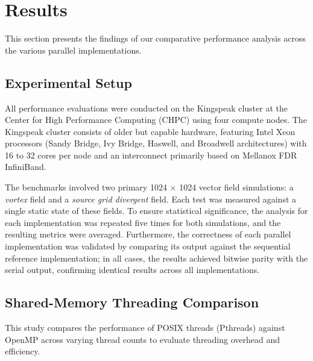 \section{Results}

This section presents the findings of our comparative performance analysis across the various parallel implementations.


\subsection{Experimental Setup}

All performance evaluations were conducted on the Kingspeak cluster at the Center for High Performance Computing (CHPC) using four compute nodes.
The Kingspeak cluster consists of older but capable hardware, featuring Intel Xeon processors (Sandy Bridge, Ivy Bridge, Haswell, and Broadwell architectures) with 16 to 32 cores per node and an interconnect primarily based on Mellanox FDR InfiniBand.


The benchmarks involved two primary 1024 $\times$ 1024 vector field simulations: a \textit{vortex} field and a \textit{source grid divergent} field.
Each test was measured against a single static state of these fields.
To ensure statistical significance, the analysis for each implementation was repeated five times for both simulations, and the resulting metrics were averaged.
Furthermore, the correctness of each parallel implementation was validated by comparing its output against the sequential reference implementation; in all cases, the results achieved bitwise parity with the serial output, confirming identical results across all implementations.


\subsection{Shared-Memory Threading Comparison}

This study compares the performance of POSIX threads (Pthreads) against OpenMP across varying thread counts to evaluate threading overhead and efficiency.

